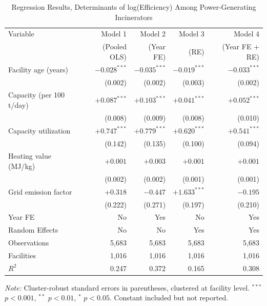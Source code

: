 \documentclass[12pt,a4paper]{article}
\begin{document}
\begin{table}[H]
  \centering
  \caption{Regression Results, Determinants of log(Efficiency) Among Power-Generating Incinerators}
  \label{tab:regression_main}
  \begin{tabular*}{\textwidth}{@{\extracolsep{\fill}}lrrrr@{}}
    \toprule
    Variable                 & Model 1          & Model 2          & Model 3          & Model 4          \\
                             & (Pooled OLS)     & (Year FE)        & (RE)             & (Year FE + RE)   \\
    \midrule
    Facility age (years)     & $-0.028^{***}$   & $-0.035^{***}$   & $-0.019^{***}$   & $-0.033^{***}$   \\
                             & (0.002)          & (0.002)          & (0.003)          & (0.002)          \\
    Capacity (per 100 t/day) & $+0.087^{***}$   & $+0.103^{***}$   & $+0.041^{***}$   & $+0.052^{***}$   \\
                             & (0.008)          & (0.009)          & (0.008)          & (0.010)          \\
    Capacity utilization     & $+0.747^{***}$   & $+0.779^{***}$   & $+0.620^{***}$   & $+0.541^{***}$   \\
                             & (0.142)          & (0.135)          & (0.100)          & (0.094)          \\
    Heating value (MJ/kg)    & $+0.001$         & $+0.003$         & $+0.001$         & $+0.001$         \\
                             & (0.002)          & (0.002)          & (0.001)          & (0.001)          \\
    Grid emission factor     & $+0.318$         & $-0.447$         & $+1.633^{***}$   & $-0.195$         \\
                             & (0.222)          & (0.271)          & (0.197)          & (0.210)          \\
    \midrule
    Year FE                  & No               & Yes              & No               & Yes              \\
    Random Effects           & No               & No               & Yes              & Yes              \\
    Observations             & 5{,}683          & 5{,}683          & 5{,}683          & 5{,}683          \\
    Facilities               & 1{,}016          & 1{,}016          & 1{,}016          & 1{,}016          \\
    $R^2$                    & 0.247            & 0.372            & 0.165            & 0.308            \\
    \bottomrule
  \end{tabular*}
  \smallskip
  \begin{minipage}{\textwidth}
    \footnotesize\emph{Note:} Cluster-robust standard errors in parentheses, clustered at facility level. $^{***}$ $p < 0.001$, $^{**}$ $p < 0.01$, $^{*}$ $p < 0.05$. Constant included but not reported.
  \end{minipage}
\end{table}
\end{document}

